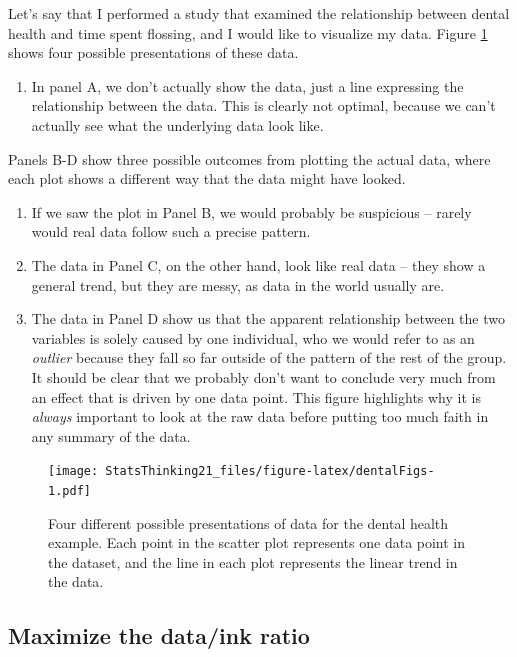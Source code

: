 \documentclass[12pt,]{book}
\providecommand{\tightlist}{%
  \setlength{\itemsep}{0pt}\setlength{\parskip}{0pt}}
\theoremstyle{definition}
\theoremstyle{definition}
\theoremstyle{definition}
\theoremstyle{remark}
\begin{document}
Let's say that I performed a study that examined the relationship between dental health and time spent flossing, and I would like to visualize my data. Figure \ref{fig:dentalFigs} shows four possible presentations of these data.

\begin{enumerate}
\def\labelenumi{\arabic{enumi}.}
\tightlist
\item
  In panel A, we don't actually show the data, just a line expressing the relationship between the data. This is clearly not optimal, because we can't actually see what the underlying data look like.
\end{enumerate}

Panels B-D show three possible outcomes from plotting the actual data, where each plot shows a different way that the data might have looked.

\begin{enumerate}
\def\labelenumi{\arabic{enumi}.}
\setcounter{enumi}{1}
\tightlist
\item
  If we saw the plot in Panel B, we would probably be suspicious -- rarely would real data follow such a precise pattern.\\
\item
  The data in Panel C, on the other hand, look like real data -- they show a general trend, but they are messy, as data in the world usually are.\\
\item
  The data in Panel D show us that the apparent relationship between the two variables is solely caused by one individual, who we would refer to as an \emph{outlier} because they fall so far outside of the pattern of the rest of the group. It should be clear that we probably don't want to conclude very much from an effect that is driven by one data point. This figure highlights why it is \emph{always} important to look at the raw data before putting too much faith in any summary of the data.
\end{enumerate}

\begin{figure}
\centering
\texttt{[image: StatsThinking21\_files/figure-latex/dentalFigs-1.pdf]}
\caption{\label{fig:dentalFigs}Four different possible presentations of data for the dental health example. Each point in the scatter plot represents one data point in the dataset, and the line in each plot represents the linear trend in the data.}
\end{figure}

\hypertarget{maximize-the-dataink-ratio}{%
\subsection{Maximize the data/ink ratio}\label{maximize-the-dataink-ratio}}
\end{document}
